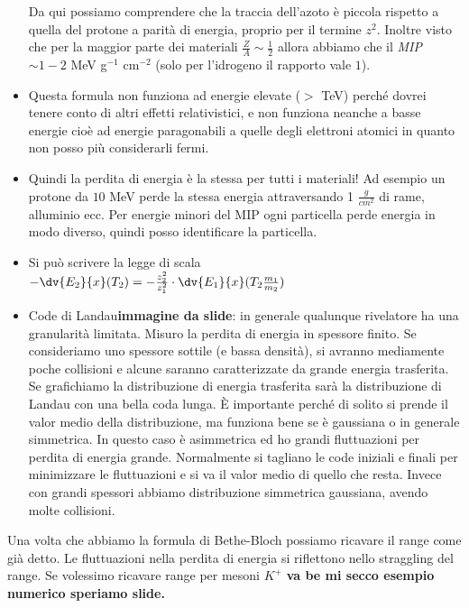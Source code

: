 \begin{itemize}
    Da qui possiamo comprendere che la traccia dell'azoto è piccola rispetto a quella del protone a parità di energia, proprio per il termine $z^2$. Inoltre visto che per la maggior parte dei materiali $\frac Z A\sim \frac12$ allora abbiamo che il \textit{MIP} $\sim1-2$ MeV g$^{-1}$ cm$^{-2}$ (solo per l'idrogeno il rapporto vale $1$).
    \item Questa formula non funziona ad energie elevate ($>$ TeV) perché dovrei tenere conto di altri effetti relativistici, e non funziona neanche a basse energie cioè ad energie paragonabili a quelle degli elettroni atomici in quanto non posso più considerarli fermi. 
    \item Quindi la perdita di energia è la stessa per tutti i materiali! Ad esempio un protone da $10$ MeV perde la stessa energia attraversando 1 $\frac g {cm^2}$ di rame, alluminio ecc. Per energie minori del MIP ogni particella perde energia in modo diverso, quindi posso identificare la particella.
    \item Si può scrivere la legge di scala $-\dv{E_2}{x}(T_2)=-\frac{z_2^2}{z_1^2}\cdot \dv{E_1}{x}(T_2\frac{m_1}{m_2})$
    \item Code di Landau\textbf{immagine da slide}: in generale qualunque rivelatore ha una granularità limitata. Misuro la perdita di energia in spessore finito. Se consideriamo uno spessore sottile (e bassa densità), si avranno mediamente poche collisioni e alcune saranno caratterizzate da grande energia trasferita. Se grafichiamo la distribuzione di energia trasferita sarà la distribuzione di Landau con una bella coda lunga. È importante perché di solito si prende il valor medio della distribuzione, ma funziona bene se è gaussiana o in generale simmetrica. In questo caso è asimmetrica ed ho grandi fluttuazioni per perdita di energia grande. Normalmente si tagliano le code iniziali e finali per minimizzare le fluttuazioni e si va il valor medio di quello che resta. Invece con grandi spessori abbiamo distribuzione simmetrica gaussiana, avendo molte collisioni.
\end{itemize}
Una volta che abbiamo la formula di Bethe-Bloch possiamo ricavare il range come già detto. Le fluttuazioni nella perdita di energia si riflettono nello straggling del range. Se volessimo ricavare range per mesoni $K^+$ \textbf{va be mi secco esempio numerico speriamo slide.}